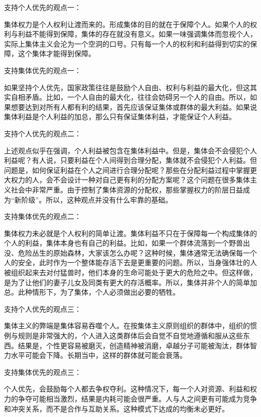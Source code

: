 支持个人优先的观点一：

集体权力是个人权利让渡而来的。形成集体的目的就在于保障个人。如果个人的权利与利益不能得到保障，集体的存在就没有意义。如果一味强调集体而忽视个人，实际上集体主义会沦为一个空洞的口号。只有每一个人的权利和利益得到切实的保障，这个集体才能得到保障。

支持集体优先的观点一：

如果坚持个人优先，国家政策往往是鼓励个人自由、权利与利益的最大化，但这其实自相矛盾。比如，一个人自由的最大化，往往会妨碍另一个人的自由。所以，如果想要达到对所有人都有利的结果，首先应该保证集体或群体的最大利益。如果说集体利益是个人利益的加总，那么只有保证集体利益，才能保证个人利益。

支持个人优先的观点二：

上述观点似乎在强调，个人利益被包含在集体利益中。但是，集体会不会侵犯个人利益呢？有人说，只要利益在个人间得到合理分配，集体就不会侵犯个人利益。但问题是，如何保证利益在个人之间进行合理分配呢？那些在分配利益过程中掌握更大权力的人，会不会设计一种对自己更有利的分配方案呢？这个问题在很多集体主义社会中非常严重。由于控制了集体资源的分配权，那些掌握权力的阶层日益成为“新阶级”。所以，这种观点并没有什么牢靠的基础。

支持集体优先的观点二：

集体权力未必就是个人权利的简单让渡。集体利益不只在于保障每一个构成集体的个人的利益，集体本身也有自己的利益。比如，如果一个群体流落到一个野兽出没、危险丛生的原始森林，大家该怎么办呢？这种时候，集体通常无法确保每一个人的安全，此时作为一个整体能存活下去是更重要的问题。所以，当身强体壮的人被组织起来去对付猛兽时，他们本身的生命可能处于更大的危险之中。但这样做，是为了让他们的妻子儿女及同类有更大的存活概率。所以，集体并非个人的简单加总。此种情形下，为了集体，个人必须做出必要的牺牲。

支持个人优先的观点三：

集体主义的弊端是集体容易吞噬个人。在按集体主义原则组织的群体中，组织的惯例与规则是非常强大的，个人进入这类群体后会自觉不自觉地遵循和服从这些东西。结果是，个性更容易被磨灭，创造精神被消磨，卓越分子可能被淘汰，群体智力水平可能会下降。长期当中，这样的群体就可能会衰落。

支持集体优先的观点三：

个人优先，会鼓励每个人都去争权夺利。这种情况下，每一个人对资源、利益和权力的争夺可能相当激烈，结果是内耗可能会很严重。人与人之间更有可能成为竞争和冲突关系，而不是合作与互助关系。这种模式下达成的均衡未必更好。

